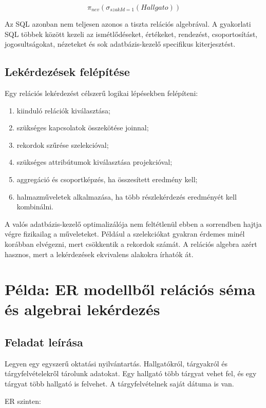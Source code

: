 \[
  \pi_{nev}(\sigma_{szakId = 1}(Hallgato))
\]

Az SQL azonban nem teljesen azonos a tiszta relációs algebrával. A gyakorlati SQL többek között kezeli az ismétlődéseket,  értékeket, rendezést, csoportosítást, jogosultságokat, nézeteket és sok adatbázis-kezelő specifikus kiterjesztést.

\subsection{Lekérdezések felépítése}

Egy relációs lekérdezést célszerű logikai lépésekben felépíteni:

\begin{enumerate}
  \item kiinduló relációk kiválasztása;
  \item szükséges kapcsolatok összekötése joinnal;
  \item rekordok szűrése szelekcióval;
  \item szükséges attribútumok kiválasztása projekcióval;
  \item aggregáció és csoportképzés, ha összesített eredmény kell;
  \item halmazműveletek alkalmazása, ha több részlekérdezés eredményét kell kombinálni.
\end{enumerate}

A valós adatbázis-kezelő optimalizálója nem feltétlenül ebben a sorrendben hajtja végre fizikailag a műveleteket. Például a szelekciókat gyakran érdemes minél korábban elvégezni, mert csökkentik a rekordok számát. A relációs algebra azért hasznos, mert a lekérdezések ekvivalens alakokra írhatók át.

\section{Példa: ER modellből relációs séma és algebrai lekérdezés}

\subsection{Feladat leírása}

Legyen egy egyszerű oktatási nyilvántartás. Hallgatókról, tárgyakról és tárgyfelvételekről tárolunk adatokat. Egy hallgató több tárgyat vehet fel, és egy tárgyat több hallgató is felvehet. A tárgyfelvételnek saját dátuma is van.

ER szinten:

